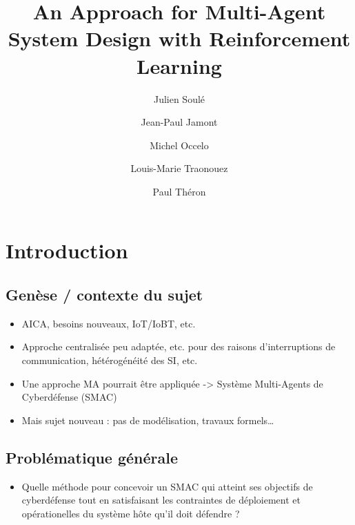 \documentclass{article}
\begin{document}
%
\title{An Approach for Multi-Agent System Design with Reinforcement Learning}
%
%
\author{Julien Soulé \and
    Jean-Paul Jamont \and
    Michel Occelo \and
    Louis-Marie Traonouez \and
    Paul Théron}
%
%
%
\maketitle              %
%

\section{Introduction}

\subsection{Genèse / contexte du sujet}

\begin{itemize}
    \item AICA, besoins nouveaux, IoT/IoBT, etc.
    \item Approche centralisée peu adaptée, etc. pour des raisons d’interruptions de communication, hétérogénéité des SI, etc.
    \item Une approche MA pourrait être appliquée -> Système Multi-Agents de Cyberdéfense (SMAC)
    \item Mais sujet nouveau : pas de modélisation, travaux formels…
\end{itemize}

\subsection{Problématique générale}
\begin{itemize}

    \item Quelle méthode pour concevoir un SMAC qui atteint ses objectifs de cyberdéfense tout en satisfaisant les contraintes de déploiement et opérationelles du système hôte qu'il doit défendre ?
\end{itemize}
\end{document}
